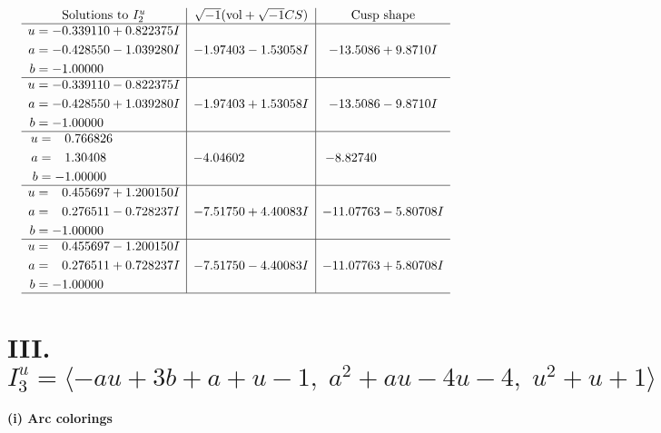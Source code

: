 \documentclass[1p]{elsarticle_modified}
\theoremstyle{definition}
\newcommand{\I}{\sqrt{-1}}
\begin{document}
$$\begin{array}{c|c|c}  
\text{Solutions to }I^u_{2}& \I (\text{vol} + \sqrt{-1}CS) & \text{Cusp shape}\\
 \hline 
\begin{aligned}
u &= -0.339110 + 0.822375 I \\
a &= -0.428550 - 1.039280 I \\
b &= -1.00000\phantom{ +0.000000I}\end{aligned}
 & -1.97403 - 1.53058 I & -13.5086 + 9.8710 I \\ \hline\begin{aligned}
u &= -0.339110 - 0.822375 I \\
a &= -0.428550 + 1.039280 I \\
b &= -1.00000\phantom{ +0.000000I}\end{aligned}
 & -1.97403 + 1.53058 I & -13.5086 - 9.8710 I \\ \hline\begin{aligned}
u &= \phantom{-}0.766826\phantom{ +0.000000I} \\
a &= \phantom{-}1.30408\phantom{ +0.000000I} \\
b &= -1.00000\phantom{ +0.000000I}\end{aligned}
 & -4.04602\phantom{ +0.000000I} & -8.82740\phantom{ +0.000000I} \\ \hline\begin{aligned}
u &= \phantom{-}0.455697 + 1.200150 I \\
a &= \phantom{-}0.276511 - 0.728237 I \\
b &= -1.00000\phantom{ +0.000000I}\end{aligned}
 & -7.51750 + 4.40083 I & -11.07763 - 5.80708 I \\ \hline\begin{aligned}
u &= \phantom{-}0.455697 - 1.200150 I \\
a &= \phantom{-}0.276511 + 0.728237 I \\
b &= -1.00000\phantom{ +0.000000I}\end{aligned}
 & -7.51750 - 4.40083 I & -11.07763 + 5.80708 I\\
 \hline 
 \end{array}$$\newpage\newpage\renewcommand{\arraystretch}{1}
\centering \section*{III. $I^u_{3}= \langle - a u+3 b+a+u-1,\;a^2+a u-4 u-4,\;u^2+u+1 \rangle$}
\flushleft \textbf{(i) Arc colorings}\\
\end{document}
